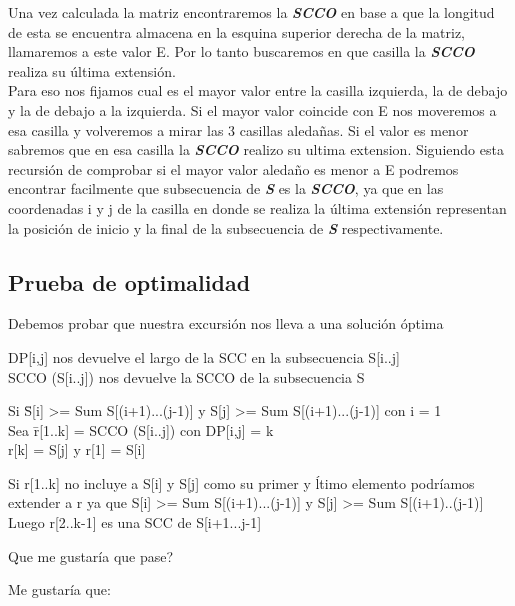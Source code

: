 \documentclass[10pt]{article}
\begin{document}
Una vez calculada la matriz encontraremos la \textbf{\textit{SCCO}} en base a que la longitud de esta se encuentra almacena en la esquina superior derecha de la matriz, llamaremos a este valor E. Por lo tanto buscaremos en que casilla la \textbf{\textit{SCCO}} realiza su \'ultima extensi\'on.\\
Para eso nos fijamos cual es el mayor valor entre la casilla izquierda, la de debajo y la de debajo a la izquierda. Si el mayor valor coincide con E nos moveremos a esa casilla y volveremos a mirar las 3 casillas aleda\~nas. Si el valor es menor sabremos que en esa casilla la \textbf{\textit{SCCO}} realizo su ultima extension. Siguiendo esta recursi\'on de comprobar si el mayor valor aleda\~no es menor a E podremos encontrar facilmente que subsecuencia de \textbf{\textit{S}} es la \textbf{\textit{SCCO}}, ya que en las coordenadas i y j de la casilla en donde se realiza la \'ultima extensi\'on representan la posici\'on de inicio y la final de la subsecuencia de \textbf{\textit{S}} respectivamente.\\



	\subsection*{Prueba de optimalidad }
	Debemos probar que nuestra excursi\'on nos lleva a una soluci\'on \'optima
		\begin{center}
			DP[i,j] nos devuelve el largo de la SCC en la subsecuencia S[i..j]\\
	
	SCCO (S[i..j]) nos devuelve la SCCO de la subsecuencia S
		\end{center}

\begin{tabbing}
		Si \=S[i] >= Sum S[(i+1)...(j-1)] y S[j] >= Sum S[(i+1)...(j-1)]  con i = 1\\
	
		\>	Sea \=r[1..k] = SCCO (S[i..j]) con DP[i,j] = k \\
		
		\>\>	r[k] = S[j] y r[1] = S[i]
	\end{tabbing}      
	Si r[1..k] no incluye a S[i] y S[j] como su primer y \'ltimo elemento podr\'iamos extender a r ya que S[i] >= Sum S[(i+1)...(j-1)] y S[j] >= Sum S[(i+1)..(j-1)]\\
	Luego r[2..k-1] es una SCC de S[i+1...j-1]

\begin{center}
		Que me gustar\'ia que pase?\\
\end{center}
	Me gustar\'ia que:\\
	
\end{document}
